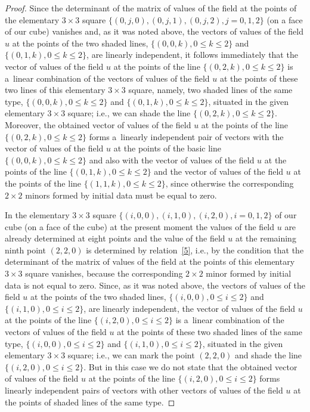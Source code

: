 \documentclass[pdftex]{sigma}
\begin{document}
\begin{proof}
Since the determinant of the matrix of values of the f\/ield at the
points of the elementary $3 \times 3$ square $\{(0, j, 0), (0, j,
1), (0, j, 2), j = 0, 1, 2\}$ (on a face of our cube) vanishes and,
as it was noted above, the vectors of values of the f\/ield $u$ at the
points of the two shaded lines, $\{(0, 0, k), 0 \leq k \leq 2\}$ and
$\{(0, 1, k), 0 \leq k \leq 2\}$, are linearly independent, it
follows immediately that the vector of values of the f\/ield $u$ at
the points of the line $\{(0, 2, k), 0 \leq k \leq 2\}$ is a~linear
combination of the vectors of values of the f\/ield $u$ at the points
of these two lines of this elementary $3 \times 3$ square, namely,
two shaded lines of the same type, $\{(0, 0, k), 0 \leq k \leq 2\}$
and $\{(0, 1, k), 0 \leq k \leq 2\}$, situated in the given
elementary $3 \times 3$ square; i.e., we can shade the line $\{(0,
2, k), 0 \leq k \leq 2\}$. Moreover, the obtained vector of values
of the f\/ield $u$ at the points of the line $\{(0, 2, k), 0 \leq k
\leq 2\}$ forms a~linearly independent pair of vectors with the
vector of values of the f\/ield $u$ at the points of the basic line
$\{(0, 0, k), 0 \leq k \leq 2\}$ and also with the vector of values
of the f\/ield $u$ at the points of the line $\{(0, 1, k), 0 \leq k
\leq 2\}$ and the vector of values of the f\/ield $u$ at the points of
the line $\{(1, 1, k), 0 \leq k \leq 2\}$, since otherwise the
corresponding $2 \times 2$ minors formed by initial data must be
equal to zero.



In the elementary $3 \times 3$ square $\{(i, 0, 0), (i, 1, 0), (i,
2, 0), i = 0, 1, 2\}$ of our cube (on a face of the cube) at the
present moment the values of the f\/ield $u$ are already determined at
eight points and the value of the f\/ield $u$ at the remaining ninth
point $(2, 2, 0)$ is determined by relation~\eqref{5}, i.e.,
by the condition that the determinant of the matrix of values of the
f\/ield at the points of this elementary $3 \times 3$ square vanishes,
because the corresponding $2 \times 2$ minor formed by initial data
is not equal to zero. Since, as it was noted above, the vectors of
values of the f\/ield $u$ at the points of the two shaded lines,
$\{(i, 0, 0), 0 \leq i \leq 2\}$ and $\{(i, 1, 0), 0 \leq i \leq
2\}$, are linearly independent, the vector of values of the f\/ield
$u$ at the points of the line $\{(i, 2, 0), 0 \leq i \leq 2\}$ is a~linear combination of the vectors of values of the f\/ield $u$ at the
points of these two shaded lines of the same type, $\{(i, 0, 0), 0
\leq i \leq 2\}$ and $\{(i, 1, 0), 0 \leq i \leq 2\}$, situated in
the given elementary $3 \times 3$ square; i.e., we can mark the
point $(2, 2, 0)$ and shade the line $\{(i, 2, 0), 0 \leq i \leq
2\}$. But in this case we do not state that the obtained vector of
values of the f\/ield $u$ at the points of the line $\{(i, 2, 0), 0
\leq i \leq 2\}$ forms linearly independent pairs of vectors with
other vectors of values of the f\/ield $u$ at the points of shaded
lines of the same type.





\end{proof}
\end{document}
